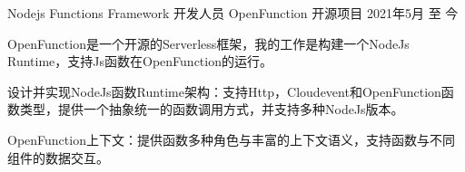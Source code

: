 

\begin{cventries}

  \cventry
    {Nodejs Functions Framework 开发人员} %
    {OpenFunction} %
    {开源项目} %
    {2021年5月 至 今} %
    {
      \begin{cvitems} %
        \setlength\itemsep{1mm}
        \item {OpenFunction是一个开源的Serverless框架，我的工作是构建一个NodeJs Runtime，支持Js函数在OpenFunction的运行。}
        \item {设计并实现NodeJs函数Runtime架构：支持Http，Cloudevent和OpenFunction函数类型，提供一个抽象统一的函数调用方式，并支持多种NodeJs版本。}
        \item {OpenFunction上下文：提供函数多种角色与丰富的上下文语义，支持函数与不同组件的数据交互。}
      \end{cvitems}
    }


\end{cventries}
